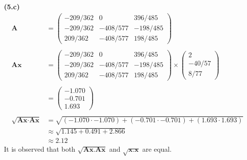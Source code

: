 \documentclass[12pt,letterpaper,fleqn]{article}
\theoremstyle{definition}
\begin{document}
\newpage
\textbf{(5.c)} 
\begin{equation*}
\begin{split}
\textbf{A} &= 
\begin{pmatrix}
-209/362 &0 &396/485\\
-209/362 &-408/577 &-198/485\\
209/362 &-408/577 &198/485
\end{pmatrix}\\
\\
\textbf{Ax} &= 
\begin{pmatrix}
-209/362 &0 &396/485\\
-209/362 &-408/577 &-198/485\\
209/362 &-408/577 &198/485
\end{pmatrix}
\times 
\begin{pmatrix}
2\\
-40/57\\
8/77
\end{pmatrix}\\
\\
&= \begin{pmatrix}
-1.070\\
-0.701\\
1.693
\end{pmatrix}\\
\\
\sqrt{\textbf{Ax}\cdot\textbf{Ax}} &= \sqrt{ (-1.070\cdot-1.070) + (-0.701\cdot-0.701) + (1.693\cdot1.693)}\\
&\approx \sqrt{1.145 + 0.491 + 2.866}\\
&\approx 2.12
\end{split}
\end{equation*}
It is observed that both $\sqrt{\textbf{Ax.Ax}}$ and $\sqrt{\textbf{x.x}}$ are equal.\\
\end{document}
